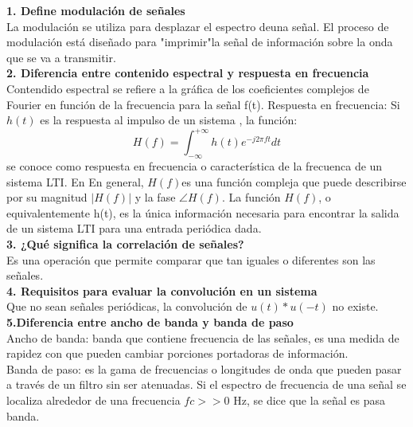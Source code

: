 \textbf{1. Define modulación de señales
} \\

La modulación se utiliza para desplazar el espectro deuna señal. El proceso de modulación está diseñado para "imprimir"la señal de información sobre la onda que se va a transmitir.\\

\textbf{2. Diferencia entre contenido espectral y respuesta en frecuencia}\\

Contendido espectral se refiere a la gráfica de los coeficientes complejos de Fourier en función de la frecuencia para la señal f(t).
 Respuesta en frecuencia: Si $h(t)$ es la respuesta al impulso de un sistema , la función: \\
 \begin{equation}
 	H(f) = \int_{-\infty}^{+\infty} h(t)e^{-j2  \pi ft}dt 
 \end{equation} se conoce como respuesta en frecuencia o característica de la frecuenca de un sistema LTI. En 
En general, $H (f)$es una función compleja que puede describirse por su magnitud $ |H (f)|$
y la fase $ \angle H(f)$. La función $H(f)$, o equivalentemente h(t), es la única información
necesaria para encontrar la salida de un sistema LTI para una entrada periódica dada.\\

\textbf{3. ¿Qué significa la correlación de señales?}\\

Es una operación que permite comparar que tan iguales o diferentes son las señales. \\

\textbf{4. Requisitos para evaluar la convolución en un sistema}\\ Que no sean señales periódicas, la convolución de $u(t)*u(-t)$ no existe.\\

\textbf{5.Diferencia entre ancho de banda y banda de paso}\\

Ancho de banda: banda que contiene frecuencia de las señales, es una medida de rapidez con que pueden cambiar porciones portadoras de información.\\

Banda de paso: es la gama de frecuencias o longitudes de onda que pueden pasar a través de un filtro sin ser atenuadas. Si el espectro de frecuencia de una señal se localiza alrededor de una frecuencia $fc >> 0$ Hz, se dice que la señal es pasa banda.\\

